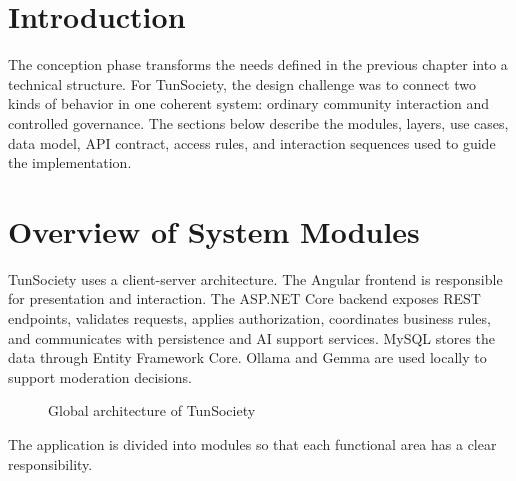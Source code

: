 \section{Introduction}

The conception phase transforms the needs defined in the previous chapter into a technical structure. For TunSociety, the design challenge was to connect two kinds of behavior in one coherent system: ordinary community interaction and controlled governance. The sections below describe the modules, layers, use cases, data model, API contract, access rules, and interaction sequences used to guide the implementation.

\section{Overview of System Modules}

TunSociety uses a client-server architecture. The Angular frontend is responsible for presentation and interaction. The ASP.NET Core backend exposes REST endpoints, validates requests, applies authorization, coordinates business rules, and communicates with persistence and AI support services. MySQL stores the data through Entity Framework Core. Ollama and Gemma are used locally to support moderation decisions.

\begin{figure}[H]
\centering
{}
\caption{Global architecture of TunSociety}
\end{figure}

The application is divided into modules so that each functional area has a clear responsibility.


